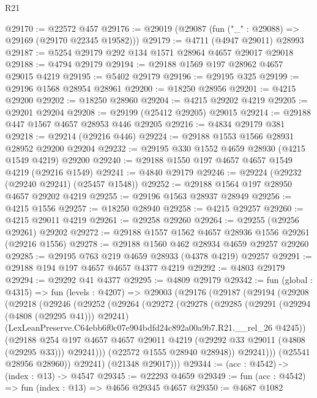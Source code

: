 \begin{lexlean}{R21}
\begin{coremodule}
@29170 := @22572 @457
@29176 := @29019 (@29087 (fun ("_" : @29088) => @29169 (@29170 @22345 @19582)))
@29179 := @4711 (@4947 @29011) @28993
@29187 := @5254 @29179 @292 @134 @1571 @28964 @4657 @29017 @29018
@29188 := @4794 @29179
@29194 := @29188 @1569 @197 @28962 @4657 @29015 @4219
@29195 := @5402 @29179
@29196 := @29195 @325
@29199 := @29196 @1568 @28954 @28961
@29200 := @18250 @28956
@29201 := @4215 @29200
@29202 := @18250 @28960
@29204 := @4215 @29202 @4219
@29205 := @29201 @29204
@29208 := @29199 (@25412 @29205) @29015
@29214 := @29188 @447 @1567 @4657 @28953 @446 @29205
@29216 := @4834 @29179 @381
@29218 := @29214 (@29216 @446)
@29224 := @29188 @1553 @1566 @28931 @28952 @29200 @29204
@29232 := @29195 @330 @1552 @4659 @28930 (@4215 @1549 @4219) @29200
@29240 := @29188 @1550 @197 @4657 @4657 @1549 @4219 (@29216 @1549)
@29241 := @4840 @29179
@29246 := @29224 (@29232 (@29240 @29241) (@25457 @1548))
@29252 := @29188 @1564 @197 @28950 @4657 @29202 @4219
@29255 := @29196 @1563 @28937 @28949
@29256 := @4215 @1556
@29257 := @18250 @28940
@29258 := @4215 @29257
@29260 := @4215 @29011 @4219
@29261 := @29258 @29260
@29264 := @29255 (@29256 @29261) @29202
@29272 := @29188 @1557 @1562 @4657 @28936 @1556 @29261 (@29216 @1556)
@29278 := @29188 @1560 @462 @28934 @4659 @29257 @29260
@29285 := @29195 @763 @219 @4659 @28933 (@4378 @4219) @29257
@29291 := @29188 @194 @197 @4657 @4657 @4377 @4219
@29292 := @4803 @29179
@29294 := @29292 @41 @4377
@29295 := @4809 @29179
@29342 := fun (global : @4315) =>
  fun (levels : @4207) =>
  @29003
    (@29176
      (@29187
        (@29194
          (@29208
            (@29218
              (@29246
                (@29252
                  (@29264
                    (@29272
                      (@29278
                        (@29285
                          (@29291 (@29294 (@4808 (@29295 @41))) @29241)
                          (LexLeanPreserve.C64ebb6f0c07e904bdfd24c892a00a9b7.R21.__rel_26 @4245))
                        (@29188
                          @254
                          @197
                          @4657
                          @4657
                          @29011
                          @4219
                          (@29292 @33 @29011 (@4808 (@29295 @33)))
                          @29241)))
                    (@22572 @1555 @28940 @28948))
                  @29241)))
            (@25541 @28956 @28960))
          @29241)
        (@21348 @29017)))
@29344 := (acc : @4542) -> (index : @13) -> @4547
@29345 := @22293 @4659
@29349 := fun (acc : @4542) => fun (index : @13) => @4656 @29345 @4657
@29350 := @4687 @1082

\end{coremodule}
\end{lexlean}
